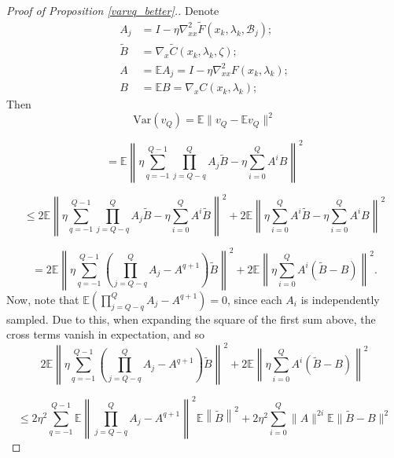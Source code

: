 \documentclass[11pt, twoside]{report}
\begin{document}
\begin{proof}[Proof of Proposition \ref{varvq_better}.]
Denote
\begin{align*}
    A_j &= I- \eta \nabla_{xx}^2 \tilde{F}(x_k,\lambda_k, \mathcal{B}_j); \\
    \tilde{B} &= \nabla_x \tilde{C} (x_k,\lambda_k,\zeta); \\
    A &= \mathbb{E}A_j = I- \eta \nabla_{xx}^2 F(x_k,\lambda_k); \\
    B &= \mathbb{E}B = \nabla_x C (x_k,\lambda_k);
\end{align*}
Then 
\[\mathrm{Var}(v_Q) = \mathbb{E} \|v_Q - \mathbb{E}v_Q \|^2\]

\[= \mathbb{E} \left\|\eta \sum_{q=-1}^{Q-1} \prod_{j = Q-q}^Q A_j \tilde{B} - \eta \sum_{i=0}^Q A^i B \right\|^2\]

\[\leq 2 \mathbb{E} \left\| \eta \sum_{q=-1}^{Q-1} \prod_{j = Q-q}^Q A_j \tilde{B} - \eta \sum_{i=0}^Q A^i \tilde{B} \right\|^2 + 2\mathbb{E} \left\| \eta \sum_{i=0}^Q A^i \tilde{B} - \eta \sum_{i=0}^Q A^i B \right\|^2 \]

\[= 2 \mathbb{E} \left\| \eta \sum_{q=-1}^{Q-1} \left( \prod_{j = Q-q}^Q A_j - A^{q+1} \right) \tilde{B} \right\|^2 + 2\mathbb{E} \left\| \eta \sum_{i=0}^Q A^i (\tilde{B} - B) \right\|^2. \]
Now, note that $\mathbb{E}\left( \prod_{j = Q-q}^Q A_j - A^{q+1} \right) = 0$, since each $A_i$ is independently sampled. Due to this, when expanding the square of the first sum above, the cross terms vanish in expectation, and so
\[2 \mathbb{E} \left\| \eta \sum_{q=-1}^{Q-1} \left( \prod_{j = Q-q}^Q A_j - A^{q+1} \right) \tilde{B} \right\|^2 + 2\mathbb{E} \left\| \eta \sum_{i=0}^Q A^i (\tilde{B} - B) \right\|^2 \]


\[\leq 2 \eta^2 \sum_{q=-1}^{Q-1} \mathbb{E} \left\| \prod_{j = Q-q}^Q A_j - A^{q+1} \right \|^2 \mathbb{E} \left\| \tilde{B} \right\|^2 + 2\eta^2 \sum_{i=0}^Q \|  A \|^{2i} \mathbb{E} \|\tilde{B} - B\|^2 \]


\end{proof}
\end{document}
